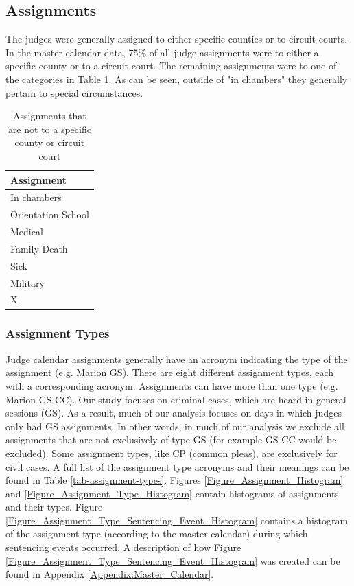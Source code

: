 \documentclass[11pt, oneside]{article}   	%
\theoremstyle{ModifiedStyle}
\begin{document}
    \subsection{Assignments}
      The judges were generally assigned to either specific counties or to circuit courts. In the master calendar data, $75\%$ of all judge assignments were to either a specific county or to a circuit court. The remaining assignments were to one of the categories in Table \ref{tab-special-assignments}. As can be seen, outside of "in chambers" they generally pertain to special circumstances.

      \begin{table}[H]
        \centering
        \caption{Assignments that are not to a specific county or circuit court}
        \label{tab-special-assignments}
        \begin{tabular}{l}
        \hline
        \textbf{Assignment}                      \\ \hline
        In chambers        \\
        Orientation School \\
        Medical            \\
        Family Death       \\
        Sick              \\
        Military           \\
        X                  \\ \hline
        \end{tabular}
      \end{table}

    \subsubsection{Assignment Types}
      Judge calendar assignments generally have an acronym indicating the type of the assignment (e.g. Marion GS). There are eight different assignment types, each with a corresponding acronym. Assignments can have more than one type (e.g. Marion GS CC). Our study focuses on criminal cases, which are heard in general sessions (GS). As a result, much of our analysis focuses on days in which judges only had GS assignments. In other words, in much of our analysis we exclude all assignments that are not exclusively of type GS (for example GS CC would be excluded). Some assignment types, like CP (common pleas), are exclusively for civil cases. A full list of the assignment type acronyms and their meanings can be found in Table \ref{tab-assignment-types}. Figures \ref{Figure_Assignment_Histogram} and  \ref{Figure_Assignment_Type_Histogram} contain histograms of assignments and their types. Figure \ref{Figure_Assignment_Type_Sentencing_Event_Histogram} contains a histogram of the assignment type (according to the master calendar) during which sentencing events occurred. A description of how Figure \ref{Figure_Assignment_Type_Sentencing_Event_Histogram} was created can be found in Appendix \ref{Appendix:Master_Calendar}.
\end{document}
